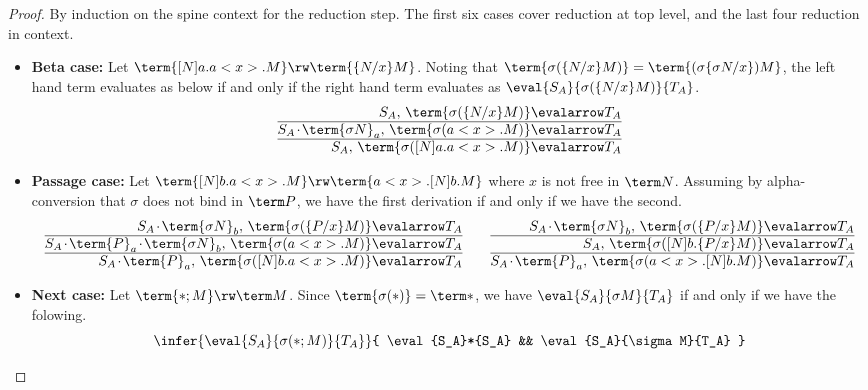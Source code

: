 \documentclass[10pt,a4paper]{amsart}
\newcommand\case[1]{\textbf{#1}}
\newcommand\msep{\kern1pt{\cdot}\kern1pt}
\begin{document}
\begin{proof}
By induction on the spine context for the reduction step. The first six cases cover reduction at top level, and the last four reduction in context.

\begin{itemize}

\item\case{Beta case:} Let $\term{[N]a.a<x>.M}\rw\term{\{N/x\}M}$. Noting that $\term{\sigma(\{N/x\}M)}=\term{(\sigma\{\sigma N/x\})M}$, the left hand term evaluates as below if and only if the right hand term evaluates as $\eval{S_A}{\sigma(\{N/x\}M)}{T_A}$.
\[
\begin{array}{@{}r@{}l@{}}
	      \strut S_A                         ,\,    \term{\sigma(\{N/x\}M)} & {}\evalarrow T_A
\\ \hline \strut S_A \msep \term{\sigma N}_a ,\,      \term{\sigma(a<x>.M)} & {}\evalarrow T_A
\\ \hline \strut S_A                         ,\, \term{\sigma([N]a.a<x>.M)} & {}\evalarrow T_A
\end{array}
\]

\item\case{Passage case:} Let $\term{[N]b.a<x>.M}\rw\term{a<x>.[N]b.M}$ where $x$ is not free in $\term N$. Assuming by alpha-conversion that $\sigma$ does not bind in $\term P$, we have the first derivation if and only if we have the second.
\[
\begin{array}{@{}r@{}l@{}}
	      \strut S_A \msep \term{\sigma N}_b                  ,\,    \term{\sigma(\{P/x\}M)} & {}\evalarrow T_A
\\ \hline \strut S_A \msep \term{P}_a \msep \term{\sigma N}_b ,\,      \term{\sigma(a<x>.M)} & {}\evalarrow T_A
\\ \hline \strut S_A \msep \term{P}_a                         ,\, \term{\sigma([N]b.a<x>.M)} & {}\evalarrow T_A
\end{array}
\qquad
\begin{array}{@{}r@{}l@{}}
	      \strut S_A \msep \term{\sigma N}_b  ,\,      \term{\sigma(\{P/x\}M)} & {}\evalarrow T_A
\\ \hline \strut S_A                          ,\, \term{\sigma([N]b.\{P/x\}M)} & {}\evalarrow T_A
\\ \hline \strut S_A \msep \term{P}_a         ,\,   \term{\sigma(a<x>.[N]b.M)} & {}\evalarrow T_A
\end{array}
\]

\item\case{Next case:} Let $\term{*;M}\rw\term M$. Since $\term{\sigma(*)}=\term*$, we have $\eval{S_A}{\sigma M}{T_A}$ if and only if we have the folowing.
\[
\infer{ \eval{S_A}{\sigma(*;M)}{T_A} }{ \eval{S_A}*{S_A} && \eval{S_A}{\sigma M}{T_A} }
\]



\end{itemize}
\end{proof}
\end{document}
